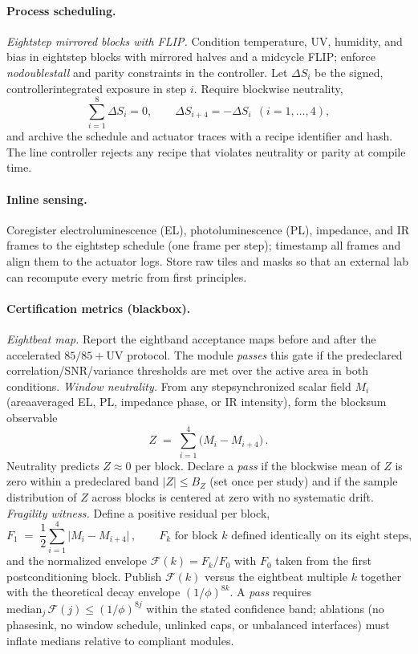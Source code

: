 \documentclass[12pt]{article}
\begin{document}
\paragraph{Process scheduling.}
\emph{Eight\textendash step mirrored blocks with FLIP.} Condition temperature, UV, humidity, and bias in eight\textendash step blocks with mirrored halves and a mid\textendash cycle FLIP; enforce \emph{no\textendash double\textendash stall} and parity constraints in the controller. Let $\Delta S_i$ be the signed, controller\textendash integrated exposure in step $i$. Require blockwise neutrality,
\[
\sum_{i=1}^{8}\Delta S_i=0,\qquad \Delta S_{i+4}=-\Delta S_i\ \ (i=1,\dots,4),
\]
and archive the schedule and actuator traces with a recipe identifier and hash. The line controller rejects any recipe that violates neutrality or parity at compile time.

\paragraph{In\textendash line sensing.}
Co\textendash register electroluminescence (EL), photoluminescence (PL), impedance, and IR frames to the eight\textendash step schedule (one frame per step); timestamp all frames and align them to the actuator logs. Store raw tiles and masks so that an external lab can recompute every metric from first principles.

\paragraph{Certification metrics (black\textendash box).}
\emph{Eight\textendash beat map.} Report the eight\textendash band acceptance maps before and after the accelerated $85/85+\mathrm{UV}$ protocol. The module \emph{passes} this gate if the predeclared correlation/SNR/variance thresholds are met over the active area in both conditions. \emph{Window neutrality.} From any step\textendash synchronized scalar field $M_i$ (area\textendash averaged EL, PL, impedance phase, or IR intensity), form the block\textendash sum observable
\[
Z \;=\; \sum_{i=1}^{4}\big(M_i - M_{i+4}\big)\,.
\]
Neutrality predicts $Z\approx 0$ per block. Declare a \emph{pass} if the blockwise mean of $Z$ is zero within a predeclared band $|Z|\le B_Z$ (set once per study) and if the sample distribution of $Z$ across blocks is centered at zero with no systematic drift. \emph{Fragility witness.} Define a positive residual per block,
\[
F_1 \;=\; \frac{1}{2}\sum_{i=1}^{4}\big|M_i - M_{i+4}\big|\,,\qquad 
F_k \text{ for block } k \text{ defined identically on its eight steps,}
\]
and the normalized envelope $\mathcal{F}(k)=F_k/F_0$ with $F_0$ taken from the first post\textendash conditioning block. Publish $\mathcal{F}(k)$ versus the eight\textendash beat multiple $k$ together with the theoretical decay envelope $(1/\phi)^{8k}$. A \emph{pass} requires $\mathrm{median}_j\,\mathcal{F}(j)\le (1/\phi)^{8j}$ within the stated confidence band; ablations (no phase\textendash sink, no window schedule, unlinked caps, or unbalanced interfaces) must inflate medians relative to compliant modules.
\end{document}
